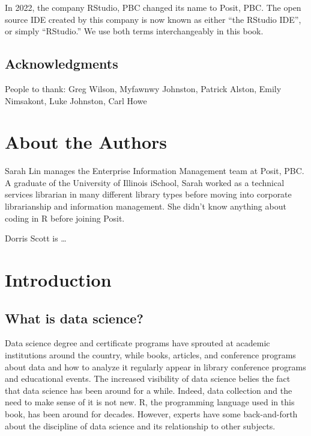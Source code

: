 \documentclass[
  krantz2]{krantz}
\begin{document}
In 2022, the company RStudio, PBC changed its name to Posit, PBC. The open source IDE created by this company is now known as either ``the RStudio IDE'', or simply ``RStudio.'' We use both terms interchangeably in this book.

\hypertarget{acknowledgments}{%
\section*{Acknowledgments}\label{acknowledgments}}


People to thank: Greg Wilson, Myfawnwy Johnston, Patrick Alston, Emily Nimsakont, Luke Johnston, Carl Howe

\hypertarget{about-the-authors}{%
\chapter*{About the Authors}\label{about-the-authors}}


Sarah Lin manages the Enterprise Information Management team at Posit, PBC. A graduate of the University of Illinois iSchool, Sarah worked as a technical services librarian in many different library types before moving into corporate librarianship and information management. She didn't know anything about coding in R before joining Posit.

Dorris Scott is \ldots{}

\mainmatter

\hypertarget{introduction}{%
\chapter{Introduction}\label{introduction}}

\hypertarget{data-science}{%
\section{What is data science?}\label{data-science}}

Data science degree and certificate programs have sprouted at academic institutions around the country, while books, articles, and conference programs about data and how to analyze it regularly appear in library conference programs and educational events. The increased visibility of data science belies the fact that data science has been around for a while. Indeed, data collection and the need to make sense of it is not new. R, the programming language used in this book, has been around for decades. However, experts have some back-and-forth about the discipline of data science and its relationship to other subjects.
\end{document}
